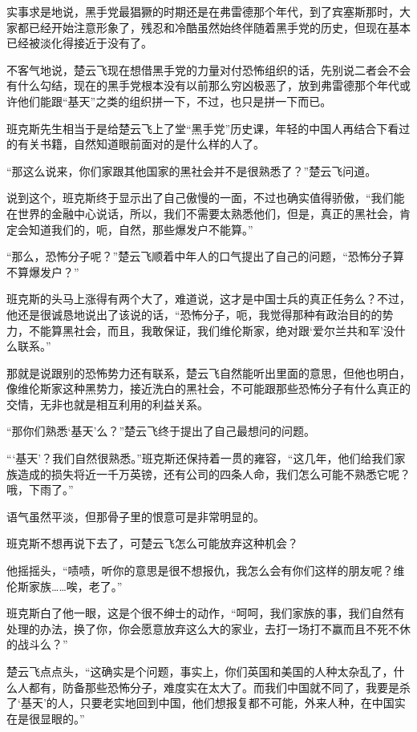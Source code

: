 实事求是地说，黑手党最猖獗的时期还是在弗雷德那个年代，到了宾塞斯那时，大家都已经开始注意形象了，残忍和冷酷虽然始终伴随着黑手党的历史，但现在基本已经被淡化得接近于没有了。

不客气地说，楚云飞现在想借黑手党的力量对付恐怖组织的话，先别说二者会不会有什么勾结，现在的黑手党根本没有以前那么穷凶极恶了，放到弗雷德那个年代或许他们能跟“基天”之类的组织拼一下，不过，也只是拼一下而已。

班克斯先生相当于是给楚云飞上了堂“黑手党”历史课，年轻的中国人再结合下看过的有关书籍，自然知道眼前面对的是什么样的人了。

“那这么说来，你们家跟其他国家的黑社会并不是很熟悉了？”楚云飞问道。

说到这个，班克斯终于显示出了自己傲慢的一面，不过也确实值得骄傲，“我们能在世界的金融中心说话，所以，我们不需要太熟悉他们，但是，真正的黑社会，肯定会知道我们的，呃，自然，那些爆发户不能算。”

“那么，恐怖分子呢？”楚云飞顺着中年人的口气提出了自己的问题，“恐怖分子算不算爆发户？”

班克斯的头马上涨得有两个大了，难道说，这才是中国士兵的真正任务么？不过，他还是很诚恳地说出了该说的话，“恐怖分子，呃，我觉得那种有政治目的的势力，不能算黑社会，而且，我敢保证，我们维伦斯家，绝对跟‘爱尔兰共和军’没什么联系。”

那就是说跟别的恐怖势力还有联系，楚云飞自然能听出里面的意思，但他也明白，像维伦斯家这种黑势力，接近洗白的黑社会，不可能跟那些恐怖分子有什么真正的交情，无非也就是相互利用的利益关系。

“那你们熟悉‘基天’么？”楚云飞终于提出了自己最想问的问题。

“‘基天’？我们自然很熟悉。”班克斯还保持着一贯的雍容，“这几年，他们给我们家族造成的损失将近一千万英镑，还有公司的四条人命，我们怎么可能不熟悉它呢？哦，下雨了。”

语气虽然平淡，但那骨子里的恨意可是非常明显的。

班克斯不想再说下去了，可楚云飞怎么可能放弃这种机会？

他摇摇头，“啧啧，听你的意思是很不想报仇，我怎么会有你们这样的朋友呢？维伦斯家族……唉，老了。”

班克斯白了他一眼，这是个很不绅士的动作，“呵呵，我们家族的事，我们自然有处理的办法，换了你，你会愿意放弃这么大的家业，去打一场打不赢而且不死不休的战斗么？”

楚云飞点点头，“这确实是个问题，事实上，你们英国和美国的人种太杂乱了，什么人都有，防备那些恐怖分子，难度实在太大了。而我们中国就不同了，我要是杀了‘基天’的人，只要老实地回到中国，他们想报复都不可能，外来人种，在中国实在是很显眼的。”

